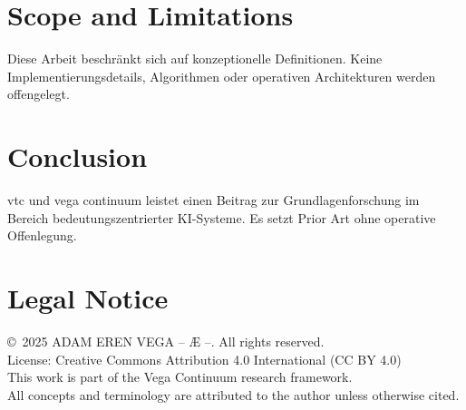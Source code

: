 \documentclass[12pt,a4paper]{article}
\begin{document}
\section{Scope and Limitations}
Diese Arbeit beschränkt sich auf konzeptionelle Definitionen. Keine Implementierungsdetails, Algorithmen oder operativen Architekturen werden offengelegt.

\section{Conclusion}
vtc und vega continuum leistet einen Beitrag zur Grundlagenforschung im Bereich bedeutungszentrierter KI-Systeme. Es setzt Prior Art ohne operative Offenlegung.

\section*{Legal Notice}
\copyright\ 2025 ADAM EREN VEGA – Æ –. All rights reserved.\\
License: Creative Commons Attribution 4.0 International (CC BY 4.0)\\
This work is part of the Vega Continuum research framework.\\
All concepts and terminology are attributed to the author unless otherwise cited.
\end{document}
